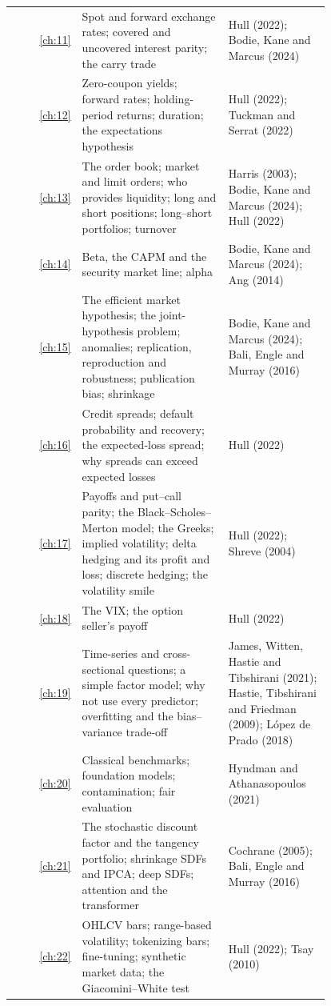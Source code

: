 \begin{longtable}{@{}r>{\raggedright\arraybackslash}p{0.468\linewidth}>{\raggedright\arraybackslash}p{0.324\linewidth}@{}}
\ref{ch:11} & Spot and forward exchange rates; covered and uncovered interest parity; the carry trade & Hull (2022); Bodie, Kane and Marcus (2024) \\
\ref{ch:12} & Zero-coupon yields; forward rates; holding-period returns; duration; the expectations hypothesis & Hull (2022); Tuckman and Serrat (2022) \\
\ref{ch:13} & The order book; market and limit orders; who provides liquidity; long and short positions; long--short portfolios; turnover & Harris (2003); Bodie, Kane and Marcus (2024); Hull (2022) \\
\ref{ch:14} & Beta, the CAPM and the security market line; alpha & Bodie, Kane and Marcus (2024); Ang (2014) \\
\ref{ch:15} & The efficient market hypothesis; the joint-hypothesis problem; anomalies; replication, reproduction and robustness; publication bias; shrinkage & Bodie, Kane and Marcus (2024); Bali, Engle and Murray (2016) \\
\ref{ch:16} & Credit spreads; default probability and recovery; the expected-loss spread; why spreads can exceed expected losses & Hull (2022) \\
\ref{ch:17} & Payoffs and put--call parity; the Black--Scholes--Merton model; the Greeks; implied volatility; delta hedging and its profit and loss; discrete hedging; the volatility smile & Hull (2022); Shreve (2004) \\
\ref{ch:18} & The VIX; the option seller's payoff & Hull (2022) \\
\ref{ch:19} & Time-series and cross-sectional questions; a simple factor model; why not use every predictor; overfitting and the bias--variance trade-off & James, Witten, Hastie and Tibshirani (2021); Hastie, Tibshirani and Friedman (2009); L\'opez de Prado (2018) \\
\ref{ch:20} & Classical benchmarks; foundation models; contamination; fair evaluation & Hyndman and Athanasopoulos (2021) \\
\ref{ch:21} & The stochastic discount factor and the tangency portfolio; shrinkage SDFs and IPCA; deep SDFs; attention and the transformer & Cochrane (2005); Bali, Engle and Murray (2016) \\
\ref{ch:22} & OHLCV bars; range-based volatility; tokenizing bars; fine-tuning; synthetic market data; the Giacomini--White test & Hull (2022); Tsay (2010) \\
\end{longtable}
\endgroup

